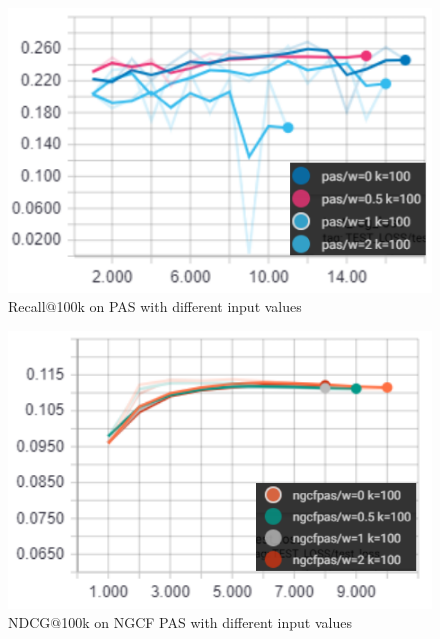 \begin{figure}
    \includegraphics[width=\linewidth]{figures/graphs/recall-pas-weights.png}
    \caption{Recall$@$100k on PAS with different input values}
    \label{fig:recall-pas-weights}
\end{figure}

\begin{figure}
    \includegraphics[width=\linewidth]{figures/graphs/ndcg100-ngcfpas-weights.png}
    \caption{NDCG$@$100k on NGCF PAS with different input values}
    \label{fig:ndcg-ngcfpas-weights}
\end{figure}

